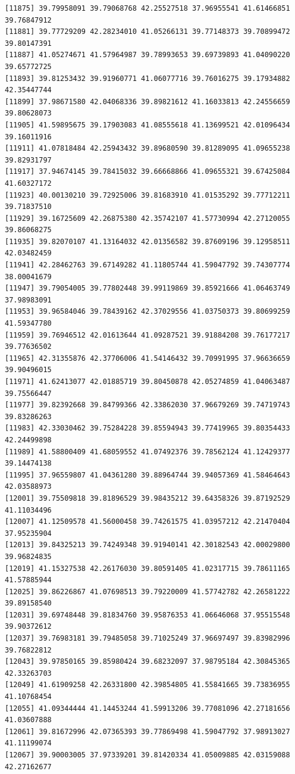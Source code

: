 \documentclass[
  letterpaper,
  DIV=11,
  numbers=noendperiod]{scrartcl}
\begin{document}
\begin{verbatim}
[11875] 39.79958091 39.79068768 42.25527518 37.96955541 41.61466851 39.76847912
[11881] 39.77729209 42.28234010 41.05266131 39.77148373 39.70899472 39.80147391
[11887] 41.05274671 41.57964987 39.78993653 39.69739893 41.04090220 39.65772725
[11893] 39.81253432 39.91960771 41.06077716 39.76016275 39.17934882 42.35447744
[11899] 37.98671580 42.04068336 39.89821612 41.16033813 42.24556659 39.80628073
[11905] 41.59895675 39.17903083 41.08555618 41.13699521 42.01096434 39.16011916
[11911] 41.07818484 42.25943432 39.89680590 39.81289095 41.09655238 39.82931797
[11917] 37.94674145 39.78415032 39.66668866 41.09655321 39.67425084 41.60327172
[11923] 40.00130210 39.72925006 39.81683910 41.01535292 39.77712211 39.71837510
[11929] 39.16725609 42.26875380 42.35742107 41.57730994 42.27120055 39.86068275
[11935] 39.82070107 41.13164032 42.01356582 39.87609196 39.12958511 42.03482459
[11941] 42.28462763 39.67149282 41.11805744 41.59047792 39.74307774 38.00041679
[11947] 39.79054005 39.77802448 39.99119869 39.85921666 41.06463749 37.98983091
[11953] 39.96584046 39.78439162 42.37029556 41.03750373 39.80699259 41.59347780
[11959] 39.76946512 42.01613644 41.09287521 39.91884208 39.76177217 39.77636502
[11965] 42.31355876 42.37706006 41.54146432 39.70991995 37.96636659 39.90496015
[11971] 41.62413077 42.01885719 39.80450878 42.05274859 41.04063487 39.75566447
[11977] 39.82392668 39.84799366 42.33862030 37.96679269 39.74719743 39.83286263
[11983] 42.33030462 39.75284228 39.85594943 39.77419965 39.80354433 42.24499898
[11989] 41.58800409 41.68059552 41.07492376 39.78562124 41.12429377 39.14474138
[11995] 37.96559807 41.04361280 39.88964744 39.94057369 41.58464643 42.03588973
[12001] 39.75509818 39.81896529 39.98435212 39.64358326 39.87192529 41.11034496
[12007] 41.12509578 41.56000458 39.74261575 41.03957212 42.21470404 37.95235904
[12013] 39.84325213 39.74249348 39.91940141 42.30182543 42.00029800 39.96824835
[12019] 41.15327538 42.26176030 39.80591405 41.02317715 39.78611165 41.57885944
[12025] 39.86226867 41.07698513 39.79220009 41.57742782 42.26581222 39.89158540
[12031] 39.69748448 39.81834760 39.95876353 41.06646068 37.95515548 39.90372612
[12037] 39.76983181 39.79485058 39.71025249 37.96697497 39.83982996 39.76822812
[12043] 39.97850165 39.85980424 39.68232097 37.98795184 42.30845365 42.33263703
[12049] 41.61909258 42.26331800 42.39854805 41.55841665 39.73836955 41.10768454
[12055] 41.09344444 41.14453244 41.59913206 39.77081096 42.27181656 41.03607888
[12061] 39.81672996 42.07365393 39.77869498 41.59047792 37.98913027 41.11199074
[12067] 39.90003005 37.97339201 39.81420334 41.05009885 42.03159088 42.27162677

\end{verbatim}
\end{document}

